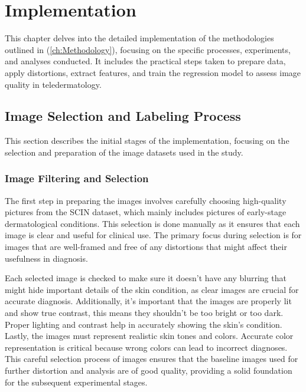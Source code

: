 \chapter{Implementation}
\label{ch:Implementation}
This chapter delves into the detailed implementation of the methodologies outlined in (\autoref{ch:Methodology}), focusing on the specific processes, experiments, and analyses conducted. It includes the practical steps taken to prepare data, apply distortions, extract features, and train the regression model to assess image quality in teledermatology.

\section{Image Selection and Labeling Process}
\label{sec:ImgSelectLabel}
This section describes the initial stages of the implementation, focusing on the selection and preparation of the image datasets used in the study. \par
\vspace{\baselineskip}
\noindent

\subsection{Image Filtering and Selection}
\label{sub:ImgFilter}
The first step in preparing the images involves carefully choosing high-quality pictures from the SCIN dataset, which mainly includes pictures of early-stage dermatological conditions. This selection is done manually as it ensures that each image is clear and useful for clinical use. The primary focus during selection is for images that are well-framed and free of any distortions that might affect their usefulness in diagnosis.\par
\vspace{\baselineskip}
\noindent
Each selected image is checked to make sure it doesn't have any blurring that might hide important details of the skin condition, as clear images are crucial for accurate diagnosis. Additionally, it's important that the images are properly lit and show true contrast, this means they shouldn't be too bright or too dark. Proper lighting and contrast help in accurately showing the skin's condition. Lastly, the images must represent realistic skin tones and colors. Accurate color representation is critical because wrong colors can lead to incorrect diagnoses. This careful selection process of images ensures that the baseline images used for further distortion and analysis are of good quality, providing a solid foundation for the subsequent experimental stages. \par


